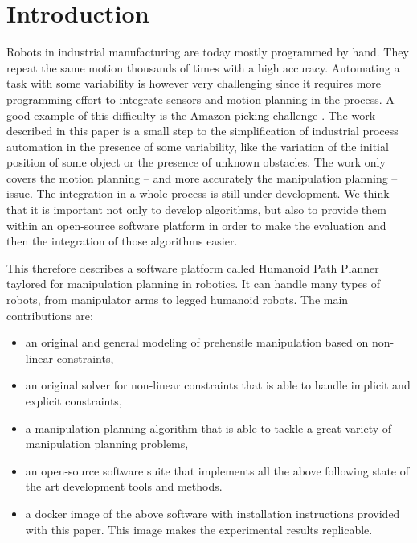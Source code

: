 \section{Introduction}

Robots in industrial manufacturing are today mostly programmed by
hand. They repeat the same motion thousands of times with a high
accuracy. Automating a task with some variability is however very
challenging since it requires more programming effort to integrate
sensors and motion planning in the process. A good example of this difficulty is
the Amazon picking challenge \cite{brock-2018}. The work described in this
paper is a small step to the simplification of industrial process
automation in the presence of some variability, like the variation of
the initial position of some object or the presence of unknown
obstacles. The work only covers the motion planning -- and
more accurately the manipulation planning -- issue. The integration in a whole
process is still under development. We think that it
is important not only to develop algorithms, but also to provide them
within an open-source software platform in order to make the
evaluation and then the integration of those algorithms easier.

This \paper therefore describes a software platform called \href{https://humanoid-path-planner.github.io/hpp-doc}{Humanoid Path
  Planner} taylored for manipulation planning in robotics. It can handle many types of robots, from manipulator arms to legged humanoid robots.
The main contributions are:
\begin{itemize}
\item an original and general modeling of prehensile manipulation based on
  non-linear constraints,
\item an original solver for non-linear constraints that is able to handle implicit and explicit constraints,
\item a manipulation planning algorithm that is able to tackle a great variety of manipulation planning problems,
\item an open-source software suite that implements all the above following state of the art development tools and methods.
\item a docker image of the above software with installation instructions provided with this paper. This image makes the experimental results replicable.
\end{itemize}

